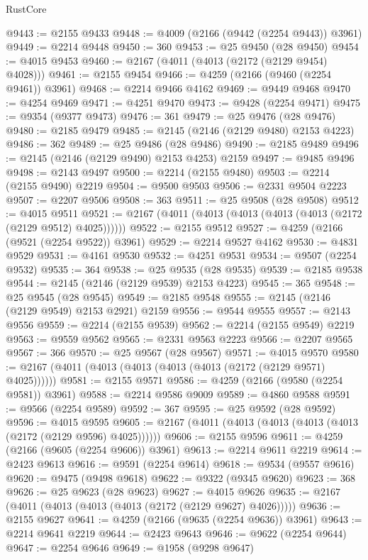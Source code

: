 \begin{lexlean}{RustCore}
\begin{coremodule}
@9443 := @2155 @9433
@9448 := @4009 (@2166 (@9442 (@2254 @9443)) @3961)
@9449 := @2214 @9448
@9450 := 360
@9453 := @25 @9450 (@28 @9450)
@9454 := @4015 @9453
@9460 := @2167 (@4011 (@4013 (@2172 (@2129 @9454) @4028)))
@9461 := @2155 @9454
@9466 := @4259 (@2166 (@9460 (@2254 @9461)) @3961)
@9468 := @2214 @9466 @4162
@9469 := @9449 @9468
@9470 := @4254 @9469
@9471 := @4251 @9470
@9473 := @9428 (@2254 @9471)
@9475 := @9354 (@9377 @9473)
@9476 := 361
@9479 := @25 @9476 (@28 @9476)
@9480 := @2185 @9479
@9485 := @2145 (@2146 (@2129 @9480) @2153 @4223)
@9486 := 362
@9489 := @25 @9486 (@28 @9486)
@9490 := @2185 @9489
@9496 := @2145 (@2146 (@2129 @9490) @2153 @4253) @2159
@9497 := @9485 @9496
@9498 := @2143 @9497
@9500 := @2214 (@2155 @9480)
@9503 := @2214 (@2155 @9490) @2219
@9504 := @9500 @9503
@9506 := @2331 @9504 @2223
@9507 := @2207 @9506
@9508 := 363
@9511 := @25 @9508 (@28 @9508)
@9512 := @4015 @9511
@9521 := @2167 (@4011 (@4013 (@4013 (@4013 (@4013 (@2172 (@2129 @9512) @4025))))))
@9522 := @2155 @9512
@9527 := @4259 (@2166 (@9521 (@2254 @9522)) @3961)
@9529 := @2214 @9527 @4162
@9530 := @4831 @9529
@9531 := @4161 @9530
@9532 := @4251 @9531
@9534 := @9507 (@2254 @9532)
@9535 := 364
@9538 := @25 @9535 (@28 @9535)
@9539 := @2185 @9538
@9544 := @2145 (@2146 (@2129 @9539) @2153 @4223)
@9545 := 365
@9548 := @25 @9545 (@28 @9545)
@9549 := @2185 @9548
@9555 := @2145 (@2146 (@2129 @9549) @2153 @2921) @2159
@9556 := @9544 @9555
@9557 := @2143 @9556
@9559 := @2214 (@2155 @9539)
@9562 := @2214 (@2155 @9549) @2219
@9563 := @9559 @9562
@9565 := @2331 @9563 @2223
@9566 := @2207 @9565
@9567 := 366
@9570 := @25 @9567 (@28 @9567)
@9571 := @4015 @9570
@9580 := @2167 (@4011 (@4013 (@4013 (@4013 (@4013 (@2172 (@2129 @9571) @4025))))))
@9581 := @2155 @9571
@9586 := @4259 (@2166 (@9580 (@2254 @9581)) @3961)
@9588 := @2214 @9586 @9009
@9589 := @4860 @9588
@9591 := @9566 (@2254 @9589)
@9592 := 367
@9595 := @25 @9592 (@28 @9592)
@9596 := @4015 @9595
@9605 := @2167 (@4011 (@4013 (@4013 (@4013 (@4013 (@2172 (@2129 @9596) @4025))))))
@9606 := @2155 @9596
@9611 := @4259 (@2166 (@9605 (@2254 @9606)) @3961)
@9613 := @2214 @9611 @2219
@9614 := @2423 @9613
@9616 := @9591 (@2254 @9614)
@9618 := @9534 (@9557 @9616)
@9620 := @9475 (@9498 @9618)
@9622 := @9322 (@9345 @9620)
@9623 := 368
@9626 := @25 @9623 (@28 @9623)
@9627 := @4015 @9626
@9635 := @2167 (@4011 (@4013 (@4013 (@4013 (@2172 (@2129 @9627) @4026)))))
@9636 := @2155 @9627
@9641 := @4259 (@2166 (@9635 (@2254 @9636)) @3961)
@9643 := @2214 @9641 @2219
@9644 := @2423 @9643
@9646 := @9622 (@2254 @9644)
@9647 := @2254 @9646
@9649 := @1958 (@9298 @9647)

\end{coremodule}
\end{lexlean}
